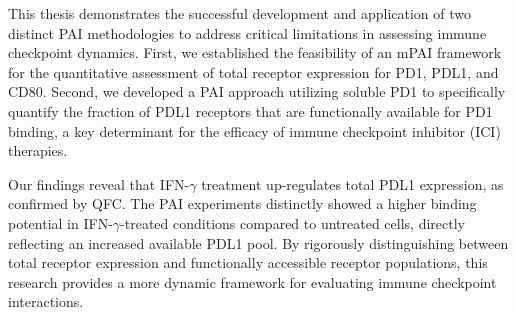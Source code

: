 This thesis demonstrates the successful development and application of two distinct PAI methodologies to address critical limitations in assessing immune checkpoint dynamics. First, we established the feasibility of an mPAI framework for the quantitative assessment of total receptor expression for PD1, PDL1, and CD80. Second, we developed a PAI approach utilizing soluble PD1 to specifically quantify the fraction of PDL1 receptors that are functionally available for PD1 binding, a key determinant for the efficacy of immune checkpoint inhibitor (ICI) therapies.

Our findings reveal that IFN-$\gamma$ treatment up-regulates total PDL1 expression, as confirmed by QFC. The PAI experiments distinctly showed a higher binding potential in IFN-$\gamma$-treated conditions compared to untreated cells, directly reflecting an increased available PDL1 pool. By rigorously distinguishing between total receptor expression and functionally accessible receptor populations, this research provides a more dynamic framework for evaluating immune checkpoint interactions. 

